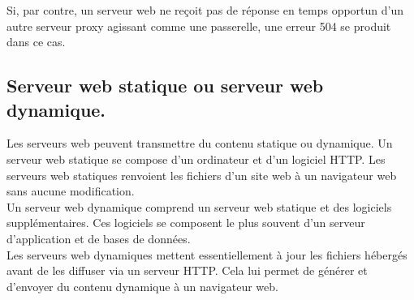 Si, par contre, un serveur web ne reçoit pas de réponse en temps opportun d’un autre serveur proxy agissant comme une passerelle, une erreur 504 se produit dans ce cas.\\
\subsection{Serveur web statique ou serveur web dynamique.}

Les serveurs web peuvent transmettre du contenu statique ou dynamique. Un serveur web statique se compose d’un ordinateur et d’un logiciel HTTP. Les serveurs web statiques renvoient les fichiers d’un site web à un navigateur web sans aucune modification.\\

Un serveur web dynamique comprend un serveur web statique et des logiciels supplémentaires. Ces logiciels se composent le plus souvent d’un serveur d’application et de bases de données.\\

Les serveurs web dynamiques mettent essentiellement à jour les fichiers hébergés avant de les diffuser via un serveur HTTP. Cela lui permet de générer et d’envoyer du contenu dynamique à un navigateur web.\\


